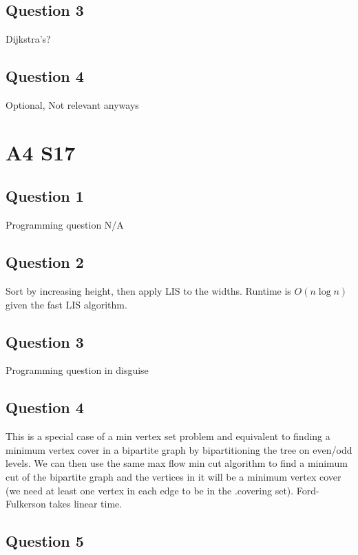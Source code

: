 \documentclass[11pt]{article}
\begin{document}
\subsection{Question 3}

Dijkstra's?

\subsection{Question 4}

Optional, Not relevant anyways

\section{A4 S17}

\subsection{Question 1}

Programming question N/A

\subsection{Question 2}

Sort by increasing height, then apply LIS to the widths. Runtime is $O(n \log n)$ given the fast LIS algorithm.

\subsection{Question 3}

Programming question in disguise

\subsection{Question 4}

This is a special case of a min vertex set problem and equivalent to finding a minimum vertex cover in a bipartite graph by bipartitioning the tree on even/odd levels. We can then use the same max flow min cut algorithm to find a minimum cut of the bipartite graph and the vertices in it will be a minimum vertex cover (we need at least one vertex in each edge to be in the .covering set). Ford-Fulkerson takes linear time.

\subsection{Question 5}
\end{document}
